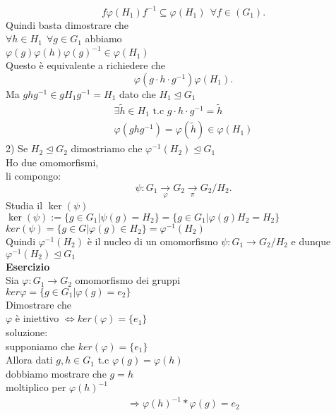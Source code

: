 \documentclass[12px]{article}
\begin{document}
{	\[
		f \varphi(H_1) f^{-1}\subseteq \varphi(H_1) \ \ \forall f\in (G_1)
	.\] 
	Quindi basta dimostrare che\\
	$\forall h\in H_1 \ \ \forall g\in G_1$ abbiamo\\
	$ \varphi(g) \varphi(h) \varphi(g)^{-1}\in \varphi(H_1)$\\
	Questo è equivalente a richiedere che\\
	\[
		\varphi(g\cdot h\cdot g^{-1}) \varphi(H_1)
	.\] 
	Ma $ghg^{-1}\in gH_1g^{-1}=H_1$ dato che $H_1\trianglelefteq G_1$\\
	\begin{gather*}
		\exists \tilde h\in H_1 \text { t.c } g\cdot h\cdot g^{-1} = \tilde h\\
		\varphi(ghg^{-1}) = \varphi(\tilde h)\in \varphi(H_1)
	\end{gather*}
	2) Se $H_2\trianglelefteq G_2$ dimostriamo che $ \varphi^{-1}(H_2)\trianglelefteq G_1$\\
	Ho due omomorfismi,\\
	li compongo:
	\[
		\psi: G_1 \xrightarrow[ \varphi]{} G_2 \xrightarrow[\pi]{} G_2/H_2
	.\] 
	Studia il $\ker (\psi)$\\
	 $\ker(\psi):= \lbrace g\in G_1 | \psi (g) = H_2\rbrace = \lbrace g\in G_1 | \varphi(g)H_2 = H_2\rbrace$\\
	 $ker (\psi) = \lbrace g\in G | \varphi(g)\in H_2 \rbrace = \varphi^{-1}(H_2)$\\
	 Quindi $ \varphi^{-1}(H_2)$ è il nucleo di un omomorfismo $\psi : G_1 \rightarrow G_2/H_2$ e dunque $ \varphi^{-1}(H_2)\trianglelefteq G_1$\\
	\textbf{Esercizio}\\
	Sia $ \varphi: G_1 \rightarrow G_2$ omomorfismo dei gruppi\\
	$ker \varphi = \lbrace g\in G_1 | \varphi(g) = e_2\rbrace$\\
	Dimostrare che\\
	$ \varphi$ è iniettivo $ \Leftrightarrow ker( \varphi) = \lbrace e_1 \rbrace$ \\
	soluzione:\\
	supponiamo che $ker ( \varphi) = \lbrace e_1\rbrace$\\
	Allora dati $g,h \in G_1$ t.c $ \varphi (g) = \varphi(h)$\\
	dobbiamo mostrare che $g=h$\\
	moltiplico per  $ \varphi(h)^{-1}$\\
	\begin{gather*}
		\Rightarrow \varphi(h)^{-1} * \varphi(g) = e_2\\

\end{gather*}}
\end{document}

